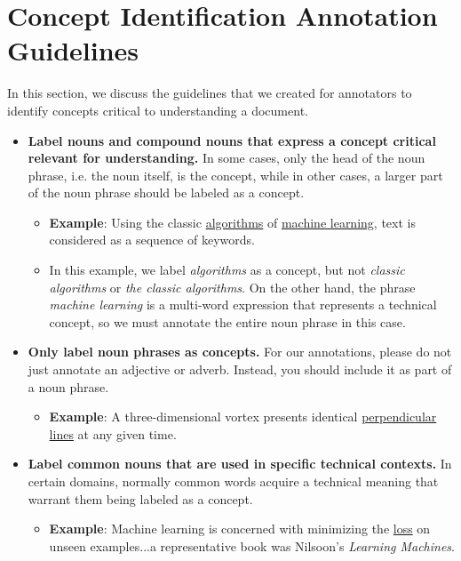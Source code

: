 \section{Concept Identification Annotation Guidelines} \label{app:concept_guidelines}

In this section, we discuss the guidelines that we created for annotators to identify concepts critical to understanding a document.

\begin{itemize}
\setlength\itemsep{-1em}
\item \textbf{Label nouns and compound nouns that express a concept critical relevant for understanding.} In some cases, only the head of the noun phrase, i.e. the noun itself, is the concept, while in other cases, a larger part of the noun phrase should be labeled as a concept.
	\vspace{-3.5mm}
	\begin{itemize}
		\setlength\itemsep{-1em}
      		\item \textbf{Example}: Using the classic \underline{algorithms} of \underline{machine learning}, text is considered as a sequence of keywords.
     		 \item In this example, we label \textit{algorithms} as a concept, but not \textit{classic algorithms} or \textit{the classic algorithms}. On the other hand, the phrase \textit{machine learning} is a multi-word expression that represents a technical concept, so we must annotate the entire noun phrase in this case.
    	\end{itemize}
\item \textbf{Only label noun phrases as concepts.} For our annotations, please do not just annotate an adjective or adverb. Instead, you should include it as part of a noun phrase.
	\vspace{-3.5mm}
	\begin{itemize}
		\setlength\itemsep{-1em}
      		\item \textbf{Example}: A three-dimensional vortex presents identical \underline{perpendicular lines} at any given time.
    	\end{itemize}
\item \textbf{Label common nouns that are used in specific technical contexts.} In certain domains, normally common words acquire a technical meaning that warrant them being labeled as a concept.
	\vspace{-3.5mm}
	\begin{itemize}
		\setlength\itemsep{-1em}
      		\item \textbf{Example}: Machine learning is concerned with minimizing the \underline{loss} on unseen examples...a representative book was Nilsoon's \textit{Learning Machines}.

\end{itemize}
\end{itemize}
